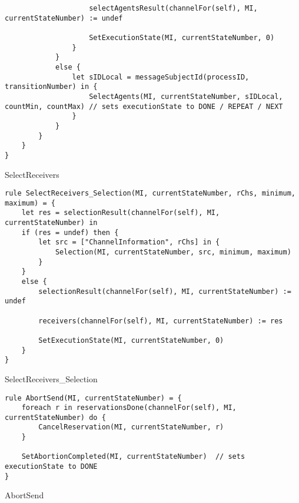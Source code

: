 \begin{listing}[H]
\begin{verbatim}
                    selectAgentsResult(channelFor(self), MI, currentStateNumber) := undef

                    SetExecutionState(MI, currentStateNumber, 0)
                }
            }
            else {
                let sIDLocal = messageSubjectId(processID, transitionNumber) in {
                    SelectAgents(MI, currentStateNumber, sIDLocal, countMin, countMax) // sets executionState to DONE / REPEAT / NEXT
                }
            }
        }
    }
}
\end{verbatim}
\caption{SelectReceivers}
\label{lst:asm:SelectReceivers}
\end{listing}




\begin{listing}[H]
\begin{verbatim}
rule SelectReceivers_Selection(MI, currentStateNumber, rChs, minimum, maximum) = {
    let res = selectionResult(channelFor(self), MI, currentStateNumber) in
    if (res = undef) then {
        let src = ["ChannelInformation", rChs] in {
            Selection(MI, currentStateNumber, src, minimum, maximum)
        }
    }
    else {
        selectionResult(channelFor(self), MI, currentStateNumber) := undef

        receivers(channelFor(self), MI, currentStateNumber) := res

        SetExecutionState(MI, currentStateNumber, 0)
    }
}
\end{verbatim}
\caption{SelectReceivers_Selection}
\label{lst:asm:SelectReceivers_Selection}
\end{listing}




\begin{listing}[H]
\begin{verbatim}
rule AbortSend(MI, currentStateNumber) = {
    foreach r in reservationsDone(channelFor(self), MI, currentStateNumber) do {
        CancelReservation(MI, currentStateNumber, r)
    }

    SetAbortionCompleted(MI, currentStateNumber)  // sets executionState to DONE
}
\end{verbatim}
\caption{AbortSend}
\label{lst:asm:AbortSend}
\end{listing}




